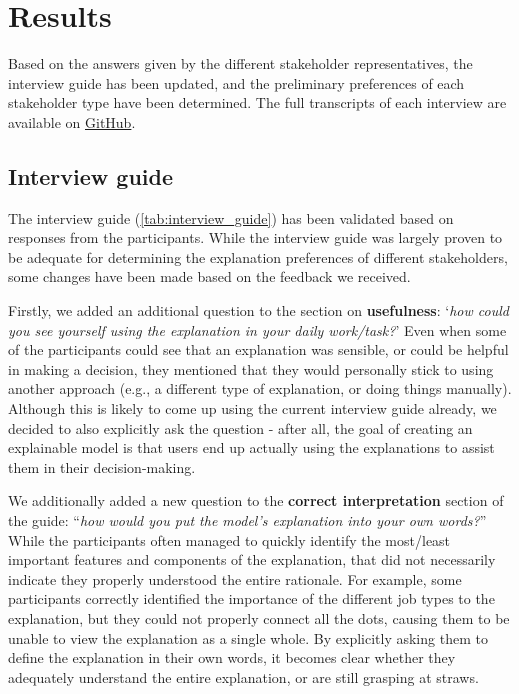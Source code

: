 \section{Results}
Based on the answers given by the different stakeholder representatives, the interview guide has been updated, and the preliminary preferences of each stakeholder type have been determined. The full transcripts of each interview are available on \href{https://anonymous.4open.science/r/JRS_explanations-84D6/}{GitHub}. 

\subsection{Interview guide}

The interview guide (\cref{tab:interview_guide}) has been validated based on responses from the participants. While the interview guide was largely proven to be adequate for determining the explanation preferences of different stakeholders, some changes have been made based on the feedback we received. 

Firstly, we added an additional question to the section on \textbf{usefulness}: `\textit{how could you see yourself using the explanation in your daily work/task?}' Even when some of the participants could see that an explanation was sensible, or could be helpful in making a decision, they mentioned that they would personally stick to using another approach (e.g., a different type of explanation, or doing things manually). Although this is likely to come up using the current interview guide already, we decided to also explicitly ask the question - after all, the goal of creating an explainable model is that users end up actually using the explanations to assist them in their decision-making. 

We additionally added a new question to the \textbf{correct interpretation} section of the guide: ``\textit{how would you put the model's explanation into your own words?}'' While the participants often managed to quickly identify the most/least important features and components of the explanation, that did not necessarily indicate they properly understood the entire rationale. For example, some participants correctly identified the importance of the different job types to the explanation, but they could not properly connect all the dots, causing them to be unable to view the explanation as a single whole. By explicitly asking them to define the explanation in their own words, it becomes clear whether they adequately understand the entire explanation, or are still grasping at straws. 


